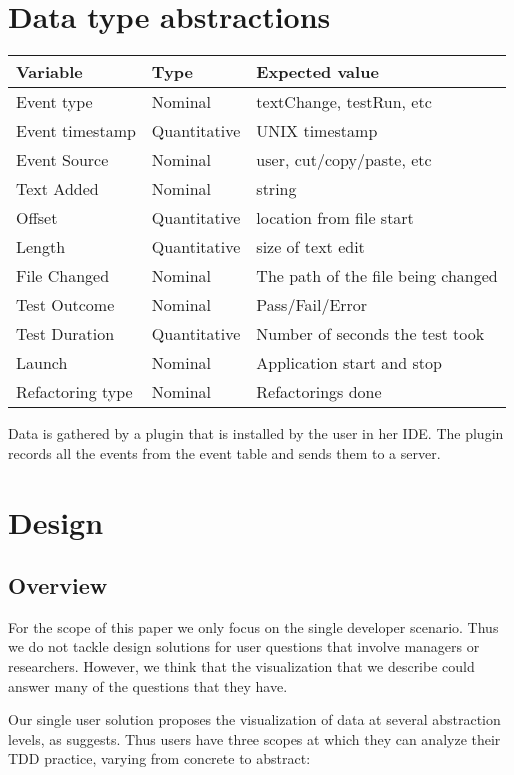 \documentclass[journal]{vgtc}                %
\begin{document}
\section{Data type abstractions}
\label{sec:data}

\begin{table}[hbt]
\begin{tabular}{l l l}
\toprule
Variable & Type & Expected value \\
\midrule
Event type & Nominal & textChange, testRun, etc \\
Event timestamp & Quantitative & UNIX timestamp \\
Event Source & Nominal & user, cut/copy/paste, etc \\
Text Added & Nominal & string \\
Offset & Quantitative & location from file start \\
Length & Quantitative & size of text edit \\
File Changed & Nominal & The path of the file being changed \\
Test Outcome & Nominal & Pass/Fail/Error \\
Test Duration & Quantitative & Number of seconds the test took \\
Launch & Nominal & Application start and stop \\
Refactoring type & Nominal & Refactorings done \\
\bottomrule
\end{tabular}
\end{table}

Data is gathered by a plugin that is installed by the user in her IDE. The plugin records all the events from the event table and sends them to a server.

\section{Design}

\subsection{Overview}

For the scope of this paper we only focus on the single developer scenario. Thus we do not tackle design solutions for user questions that involve managers or researchers.  However, we think that the visualization that we describe could answer many of the questions that they have.

Our single user solution proposes the visualization of data at several abstraction levels, as \cite{two} suggests. Thus users have three scopes at which they can analyze their TDD practice, varying from concrete to abstract:
\end{document}
